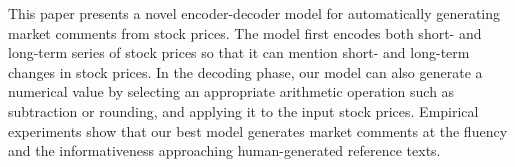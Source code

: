 This paper presents a novel encoder-decoder model for automatically generating market comments from stock prices. The model first encodes both short- and long-term series of stock prices so that it can mention short- and long-term changes in stock prices. In the decoding phase, our model can also generate a numerical value by selecting an appropriate arithmetic operation such as subtraction or rounding, and applying it to the input stock prices. Empirical experiments show that our best model generates market comments at the fluency and the informativeness approaching human-generated reference texts.

